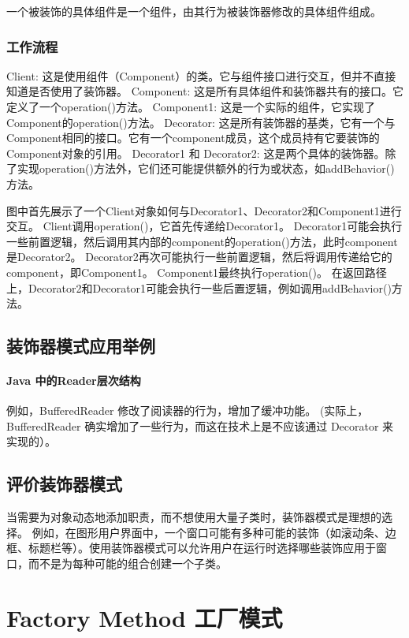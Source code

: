 一个被装饰的具体组件是一个组件，由其行为被装饰器修改的具体组件组成。



\subsubsection{工作流程}
Client: 这是使用组件（Component）的类。它与组件接口进行交互，但并不直接知道是否使用了装饰器。
Component: 这是所有具体组件和装饰器共有的接口。它定义了一个operation()方法。
Component1: 这是一个实际的组件，它实现了Component的operation()方法。
Decorator: 这是所有装饰器的基类，它有一个与Component相同的接口。它有一个component成员，这个成员持有它要装饰的Component对象的引用。
Decorator1 和 Decorator2: 这是两个具体的装饰器。除了实现operation()方法外，它们还可能提供额外的行为或状态，如addBehavior()方法。

图中首先展示了一个Client对象如何与Decorator1、Decorator2和Component1进行交互。
Client调用operation()，它首先传递给Decorator1。
Decorator1可能会执行一些前置逻辑，然后调用其内部的component的operation()方法，此时component是Decorator2。
Decorator2再次可能执行一些前置逻辑，然后将调用传递给它的component，即Component1。
Component1最终执行operation()。
在返回路径上，Decorator2和Decorator1可能会执行一些后置逻辑，例如调用addBehavior()方法。


\subsection{装饰器模式应用举例}

\paragraph{Java 中的Reader层次结构}
例如，BufferedReader 修改了阅读器的行为，增加了缓冲功能。
(实际上，BufferedReader 确实增加了一些行为，而这在技术上是不应该通过 Decorator 来实现的）。

\subsection{评价装饰器模式}

当需要为对象动态地添加职责，而不想使用大量子类时，装饰器模式是理想的选择。
例如，在图形用户界面中，一个窗口可能有多种可能的装饰（如滚动条、边框、标题栏等）。使用装饰器模式可以允许用户在运行时选择哪些装饰应用于窗口，而不是为每种可能的组合创建一个子类。


\section{Factory Method 工厂模式}

